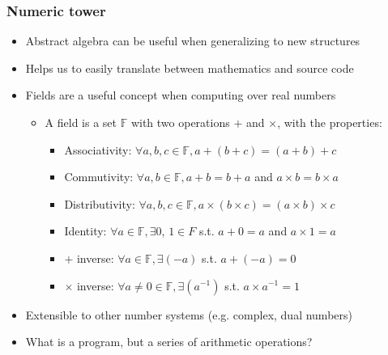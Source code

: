 \documentclass{beamer}
\begin{document}


    \begin{frame}
        \frametitle{Numeric tower}
        \begin{itemize}
            \item Abstract algebra can be useful when generalizing to new structures
            \item Helps us to easily translate between mathematics and source code
            \item Fields are a useful concept when computing over real numbers
            \begin{itemize}
                \item A field is a set $\mathbb{F}$ with two operations $+$ and $\times$, with the properties:
                \begin{itemize}
                    \item Associativity: $\forall a, b, c \in \mathbb{F}, a + (b + c) = (a + b) + c$
                    \item Commutivity: $\forall a, b \in \mathbb{F}, a + b = b + a$ and $a\times b = b\times a$
                    \item Distributivity: $\forall a, b, c \in \mathbb{F}, a \times (b \times c) = (a \times b) \times c$
                    \item Identity: $\forall a \in \mathbb{F}, \exists 0$, $ 1 \in F$ s.t. $a + 0 = a$ and $a\times 1= a$
                    \item $+$ inverse: $\forall a\in \mathbb{F}, \exists (-a)$ s.t. $a + (-a) = 0$
                    \item $\times$ inverse: $\forall a\neq 0 \in \mathbb{F}, \exists (a^{-1})$ s.t. $a \times a^{-1} = 1$
                \end{itemize}
            \end{itemize}
            \item Extensible to other number systems (e.g. complex, dual numbers)
            \item What is a program, but a series of arithmetic operations?
        \end{itemize}
    \end{frame}
\end{document}
